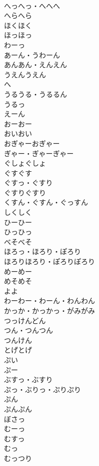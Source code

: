 \documentclass[8pt]{extreport}
\begin{document}
\begin{CJK}{UTF8}{min}
\\	へっへっ・へへへ	
\\	へらへら	
\\	ほくほく	
\\	ほっほっ	
\\	わーっ	
\\	あーん・うわーん	
\\	あんあん・えんえん	
\\	うえんうえん	
\\	へ 
\\	うるうる・うるるん	
\\	うるっ	
\\	えーん	
\\	おーおー	
\\	おいおい	
\\	おぎゃーおぎゃー	
\\	ぎゃー・ぎゃーぎゃー	
\\	ぐしょぐしょ	
\\	ぐすぐす	
\\	ぐすっ・ぐすり	
\\	ぐすりぐすり	
\\	くすん・ぐすん・ぐっすん	
\\	しくしく	
\\	ひーひー	
\\	ひっひっ	
\\	べそべそ	
\\	ほろっ・ほろり・ぽろり	
\\	ほろりほろり・ぽろりぽろり	
\\	めーめー	
\\	めそめそ	
\\	よよ	
\\	わーわー・わーん・わんわん	
\\	かっか・かっかっ・がみがみ	
\\	つっけんどん	
\\	つん・つんつん	
\\	つんけん	
\\	とげとげ	
\\	ぷい	
\\	ぷー	
\\	ぶすっ・ぶすり	
\\	ぷっ・ぶりっ・ぷりぷり	
\\	ぷん	
\\	ぷんぷん	
\\	ぼさっ	
\\	むーっ	
\\	むすっ	
\\	むっ	
\\	むっつり	

\end{CJK}
\end{document}
